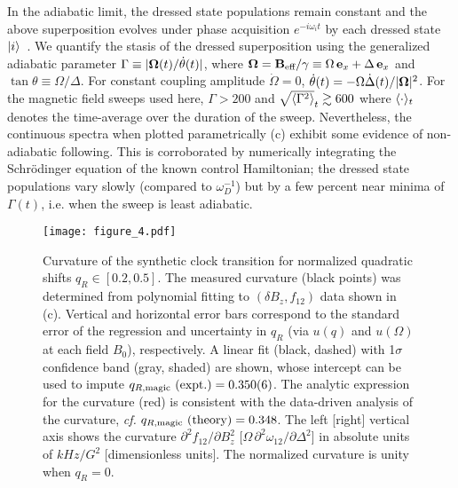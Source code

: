 \documentclass[aps,prl,reprint,superscriptaddress,floatfix]{revtex4-1}
\begin{document}
In the adiabatic limit, the dressed state populations remain constant and the above superposition evolves under phase acquisition $e^{-i \omega_i t}$ by each dressed state $\vert i \rangle $~\cite{messiah_quantum_1962}. 
We quantify the stasis of the dressed superposition using the generalized adiabatic parameter $\Gamma \equiv \vert \mathbf{\Omega}(t)/\dot{\theta}(t) \vert $, where $\mathbf{\Omega} = \mathbf{B}_{\text{eff}} / \gamma \equiv \Omega \, \mathbf{e}_x + \Delta \, \mathbf{e}_x$ and $\tan \theta \equiv \Omega / \Delta$.
For constant coupling amplitude $\dot{\Omega} = 0$, $\dot{\theta}(t) = -\Omega \dot{\Delta}(t)/\vert \mathbf{\Omega} \vert ^2$.
For the magnetic field sweeps used here, $\Gamma > 200$ and $\sqrt{\langle \Gamma^2 \rangle}_t \gtrsim 600$ where $\langle \cdot \rangle_t$ denotes the time-average over the duration of the sweep.
Nevertheless, the continuous spectra when plotted parametrically (c) exhibit some evidence of non-adiabatic following.
This is corroborated by numerically integrating the Schr\"{o}dinger equation of the known control Hamiltonian; the dressed state populations vary slowly (compared to $\omega_D^{-1}$) but by a few percent near minima of $\Gamma(t)$, i.e. when the sweep is least adiabatic.
\begin{figure}
    \texttt{[image: figure\_4.pdf]}
    \caption{
    \label{fig:curvature_vs_qR}
        Curvature of the synthetic clock transition for normalized quadratic shifts $q_R \in [0.2, 0.5]$.
        The measured curvature (black points) was determined from polynomial fitting to $(\delta B_z, f_{12})$ data shown in (c).
        Vertical and horizontal error bars correspond to the standard error of the regression and uncertainty in $q_R$ (via $u(q)$ and $u(\Omega)$ at each field $B_0$), respectively.
        A linear fit (black, dashed) with 1$\sigma$ confidence band (gray, shaded) are shown, whose intercept can be used to impute $q_{R,\text{magic}}\text{ (expt.)} = 0.350(6)$.
        The analytic expression for the curvature (red) is consistent with the data-driven analysis of the curvature, \textit{cf.} $q_{R,\text{magic}}\text{ (theory)} = 0.348$.
        The left [right] vertical axis shows the curvature $\partial^2 f_{12}/\partial B_z^2$ [$\Omega\, \partial^2\omega_{12}/\partial \Delta^2$] in absolute units of $\unit{kHz/G^2}$ [dimensionless units].
        The normalized curvature is unity when $q_R=0$.
    }
\end{figure}
\end{document}
